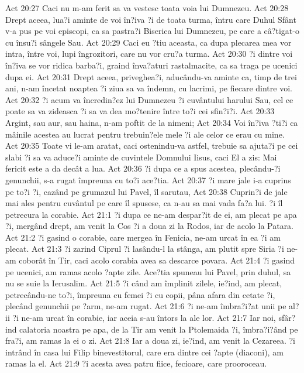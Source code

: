 Act 20:27  Caci nu m-am ferit sa va vestesc toata voia lui Dumnezeu.
Act 20:28  Drept aceea, lua?i aminte de voi în?iva ?i de toata turma, întru care Duhul Sfânt v-a pus pe voi episcopi, ca sa pastra?i Biserica lui Dumnezeu, pe care a câ?tigat-o cu însu?i sângele Sau.
Act 20:29  Caci eu ?tiu aceasta, ca dupa plecarea mea vor intra, între voi, lupi îngrozitori, care nu vor cru?a turma.
Act 20:30  ?i dintre voi în?iva se vor ridica barba?i, graind înva?aturi rastalmacite, ca sa traga pe ucenici dupa ei.
Act 20:31  Drept aceea, priveghea?i, aducându-va aminte ca, timp de trei ani, n-am încetat noaptea ?i ziua sa va îndemn, cu lacrimi, pe fiecare dintre voi.
Act 20:32  ?i acum va încredin?ez lui Dumnezeu ?i cuvântului harului Sau, cel ce poate sa va zideasca ?i sa va dea mo?tenire între to?i cei sfin?i?i.
Act 20:33  Argint, sau aur, sau haina, n-am poftit de la nimeni;
Act 20:34  Voi în?iva ?ti?i ca mâinile acestea au lucrat pentru trebuin?ele mele ?i ale celor ce erau cu mine.
Act 20:35  Toate vi le-am aratat, caci ostenindu-va astfel, trebuie sa ajuta?i pe cei slabi ?i sa va aduce?i aminte de cuvintele Domnului Iisus, caci El a zis: Mai fericit este a da decât a lua.
Act 20:36  ?i dupa ce a spus acestea, plecându-?i genunchii, s-a rugat împreuna cu to?i ace?tia.
Act 20:37  ?i mare jale i-a cuprins pe to?i ?i, cazând pe grumazul lui Pavel, îl sarutau,
Act 20:38  Cuprin?i de jale mai ales pentru cuvântul pe care îl spusese, ca n-au sa mai vada fa?a lui. ?i îl petrecura la corabie.
Act 21:1  ?i dupa ce ne-am despar?it de ei, am plecat pe apa ?i, mergând drept, am venit la Cos ?i a doua zi la Rodos, iar de acolo la Patara.
Act 21:2  ?i gasind o corabie, care mergea în Fenicia, ne-am urcat în ea ?i am plecat.
Act 21:3  ?i zarind Ciprul ?i lasându-l la stânga, am plutit spre Siria ?i ne-am coborât în Tir, caci acolo corabia avea sa descarce povara.
Act 21:4  ?i gasind pe ucenici, am ramas acolo ?apte zile. Ace?tia spuneau lui Pavel, prin duhul, sa nu se suie la Ierusalim.
Act 21:5  ?i când am împlinit zilele, ie?ind, am plecat, petrecându-ne to?i, împreuna cu femei ?i cu copii, pâna afara din cetate ?i, plecând genunchii pe ?arm, ne-am rugat.
Act 21:6  ?i ne-am îmbra?i?at unii pe al?ii ?i ne-am urcat în corabie, iar aceia s-au întors la ale lor.
Act 21:7  Iar noi, sfâr?ind calatoria noastra pe apa, de la Tir am venit la Ptolemaida ?i, îmbra?i?ând pe fra?i, am ramas la ei o zi.
Act 21:8  Iar a doua zi, ie?ind, am venit la Cezareea. ?i intrând în casa lui Filip binevestitorul, care era dintre cei ?apte (diaconi), am ramas la el.
Act 21:9  ?i acesta avea patru fiice, fecioare, care prooroceau.
